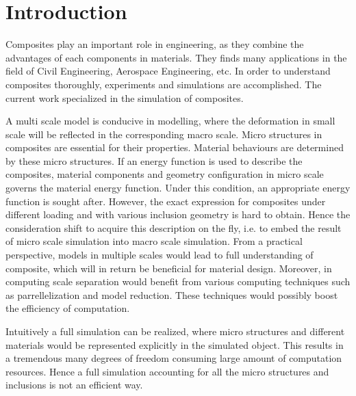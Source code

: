 %
%

\chapter{Introduction}

Composites play an important role in engineering, as they combine the advantages of each components in materials. They finds many applications in the field of Civil Engineering, Aerospace Engineering, etc. In order to understand composites thoroughly, experiments and simulations are accomplished. The current work specialized in the simulation of composites.

A multi scale model is conducive in modelling, where the deformation in small scale will be reflected in the corresponding macro scale. Micro structures in composites are essential for their properties. Material behaviours are determined by these micro structures. If an energy function is used to describe the composites, material components and geometry configuration in micro scale governs the material energy function. Under this condition, an appropriate energy function is sought after. However, the exact expression for composites under different loading and with various inclusion geometry is hard to obtain. Hence the consideration shift to acquire this description on the fly, i.e. to embed the result of micro scale simulation into macro scale simulation. From a practical perspective, models in multiple scales would lead to full understanding of composite, which will in return be beneficial for material design. Moreover, in computing scale separation would benefit from various computing techniques such as parrellelization and model reduction. These techniques would possibly boost the efficiency of computation. 

Intuitively a full simulation can be realized, where micro structures and different materials would be represented explicitly in the simulated object. This results in a tremendous many degrees of freedom consuming large amount of computation resources. Hence a full simulation accounting for all the micro structures and inclusions is not an efficient way.

